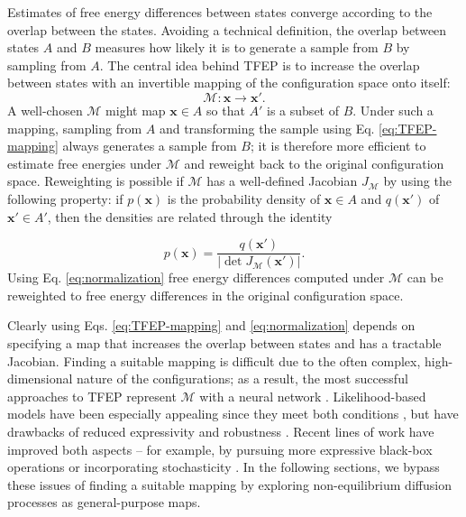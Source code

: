\documentclass[9pt,twocolumn,twoside]{pnas-new}
\begin{document}
Estimates of free energy differences between states converge according to the overlap between the states. Avoiding a technical definition, the overlap between states $A$ and $B$ measures how likely it is to generate a sample from $B$ by sampling from $A$. The central idea behind TFEP is to increase the overlap between states with an invertible mapping of the configuration space onto itself:
\begin{equation}
    \label{eq:TFEP-mapping}
    \mathcal{M}:\mathbf{x}\rightarrow\mathbf{x}'.
\end{equation}
A well-chosen $\mathcal{M}$ might map $\mathbf{x} \in A$ so that $A'$ is a subset of $B$. Under such a mapping, sampling from $A$ and transforming the sample using Eq. \ref{eq:TFEP-mapping} always generates a sample from $B$; it is therefore more efficient to estimate free energies under $\mathcal{M}$ and reweight back to the original configuration space. Reweighting is possible if $\mathcal{M}$ has a well-defined Jacobian $J_\mathcal{M}$ by using the following property: if $p(\mathbf{x})$ is the probability density of $\mathbf{x} \in A$ and $q(\mathbf{x}')$ of $\mathbf{x}' \in A'$, then the densities are related through the identity

\begin{equation}
    \label{eq:normalization}
    p(\mathbf{x}) = \frac{q(\mathbf{x}')}{| \det J_{\mathcal{M}}(\mathbf{x}')|}.
\end{equation}
Using Eq. \ref{eq:normalization} free energy differences computed under $\mathcal{M}$ can be reweighted to free energy differences in the original configuration space.

Clearly using Eqs. \ref{eq:TFEP-mapping} and \ref{eq:normalization} depends on specifying a map that increases the overlap between states and has a tractable Jacobian. Finding a suitable mapping is difficult due to the often complex, high-dimensional nature of the configurations; as a result, the most successful approaches to TFEP represent $\mathcal{M}$ with a neural network \cite{wirnsberger-TFEP,LFEP}. Likelihood-based models have been especially appealing since they meet both conditions \cite{NFReview,RealNVP,NeuralODE}, but have drawbacks of reduced expressivity and robustness \cite{bbvi}. Recent lines of work have improved both aspects -- for example, by pursuing more expressive black-box operations or incorporating stochasticity \cite{smooth-NF,neural-spline,AIS-NF,SNF}. In the following sections, we bypass these issues of finding a suitable mapping by exploring non-equilibrium diffusion processes as general-purpose maps.
\end{document}
